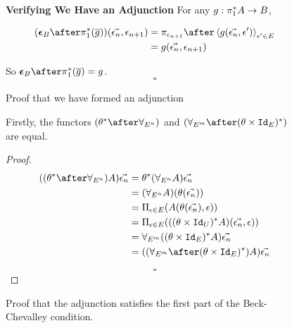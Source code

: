 \documentclass{Report}
\begin{document}
\begin{figure}
    \begin{framed}
        \centering
        \textbf{Verifying We Have an Adjunction}
        \centering
        For any $g: \pi_1^* A \rightarrow B$,
        
        \begin{align}
            (\counit{B}\after\pstar(\bar{g}))(\env, \e_{n+1}) & = \pi_{\e_{n+1}}\after\finpr{g(\env, \e')}{\e'\in E}\\
            &= g(\env, \e_{n+1})
        \end{align}
        
        \centering
        So $\counit{B}\after\pstar(\bar{g}) = g$.
        $$\square$$
    \end{framed}
    \caption{Proof that we have formed an adjunction}
    \label{AdjunctionProof}
\end{figure}




\begin{figure}
    \begin{framed}
        
\begin{theorem}
    Firstly, the functors $(\theta\star\after\allEn)$ and $(\allEm\after(\theta\times\Id{E})\star)$ are equal.

\end{theorem}

    \begin{proof}

    \begin{align}
    ((\theta\star\after\allEn)A)\env &= \theta\star(\allEn  A)\env\\
        &= (\allEn A)(\theta(\env))\\
        &= \Pi_{\e\in E}(A(\theta(\env), \e))\\
    &= \Pi_{\e\in E}(((\theta\times \Id{U})\star A)(\env,   \e))\\
        &= \allEm((\theta\times\Id{E})\star A)\env\\
        &= ((\allEm\after(\theta\times\Id{E})\star)A)\env
    \end{align}

    $$\square$$
    \end{proof}
    \end{framed}
    \caption{Proof that the adjunction satisfies the first part of the Beck-Chevalley condition.}
    \label{BeckChevalley1}
\end{figure}
\end{document}
